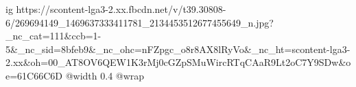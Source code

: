  
 
 
 
 

\ifcmt
  ig https://scontent-lga3-2.xx.fbcdn.net/v/t39.30808-6/269694149_1469637333411781_2134453512677455649_n.jpg?_nc_cat=111&ccb=1-5&_nc_sid=8bfeb9&_nc_ohc=nFZpgc_o8r8AX8lRyVo&_nc_ht=scontent-lga3-2.xx&oh=00_AT8OV6QEW1K3rMj0cGZpSMuWircRTqCAaR9Lt2oC7Y9SDw&oe=61C66C6D
  @width 0.4
  @wrap 
\fi
